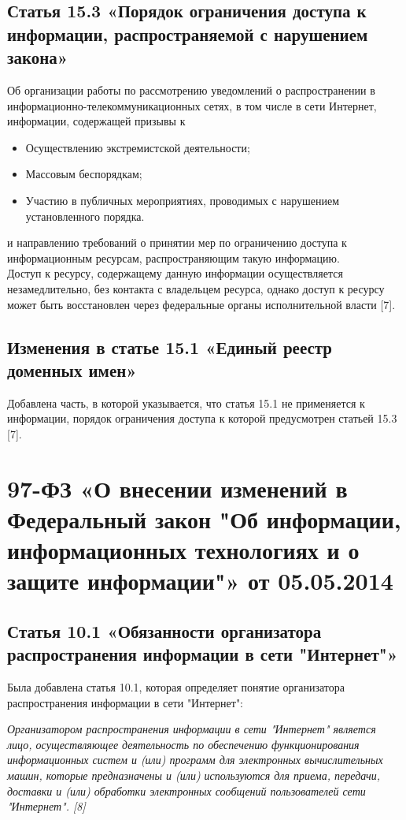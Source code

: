 \documentclass[14pt,a4paper,report]{article}
\begin{document}
\subsection{Статья 15.3 «Порядок ограничения доступа к информации, распространяемой с нарушением закона»}

Об организации работы по рассмотрению уведомлений о распространении в информационно-телекоммуникационных сетях, в том числе в сети Интернет, информации, содержащей призывы к \begin{itemize}
	\item Осуществлению экстремистской деятельности;
	\item Массовым беспорядкам;
	\item Участию в публичных мероприятиях, проводимых с нарушением установленного порядка.
\end{itemize}
и направлению требований о принятии мер по ограничению доступа к информационным ресурсам, распространяющим такую информацию.\\

Доступ к ресурсу, содержащему данную информации осуществляется незамедлительно, без контакта с владельцем ресурса, однако доступ к ресурсу может быть восстановлен через федеральные органы исполнительной власти [7].

\subsection{Изменения в статье 15.1 «Единый реестр доменных имен»}

Добавлена часть, в которой указывается, что статья 15.1 не применяется к информации, порядок ограничения доступа к которой предусмотрен статьей 15.3 [7].

\section{97-ФЗ «О внесении изменений в Федеральный закон "Об информации, информационных технологиях и о защите информации"» от 05.05.2014}

\subsection{Статья 10.1 «Обязанности организатора распространения информации в сети "Интернет"»}

Была добавлена статья 10.1, которая определяет понятие организатора распространения информации в сети "Интернет":

\begin{displayquote}
	\emph{Организатором распространения информации в сети "Интернет" является лицо, осуществляющее деятельность по обеспечению функционирования информационных систем и (или) программ для электронных вычислительных машин, которые предназначены и (или) используются для приема, передачи, доставки и (или) обработки электронных сообщений пользователей сети "Интернет". [8]}
\end{displayquote}
\end{document}
